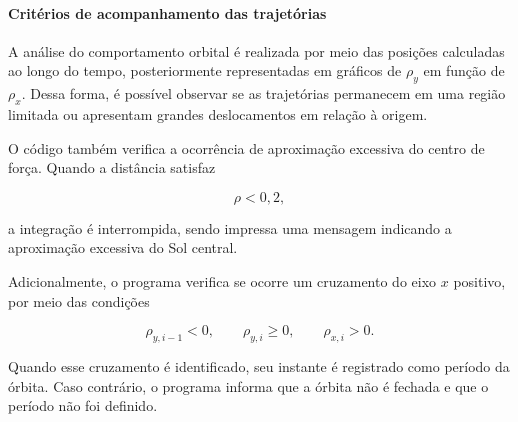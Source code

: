 \documentclass[12pt,a4paper]{article}
\begin{document}
\paragraph{Critérios de acompanhamento das trajetórias}

A análise do comportamento orbital é realizada por meio das posições calculadas ao longo do tempo, posteriormente representadas em gráficos de $\rho_y$ em função de $\rho_x$. Dessa forma, é possível observar se as trajetórias permanecem em uma região limitada ou apresentam grandes deslocamentos em relação à origem.

O código também verifica a ocorrência de aproximação excessiva do centro de força. Quando a distância satisfaz

\begin{equation}
    \rho<0,2,
\end{equation}

a integração é interrompida, sendo impressa uma mensagem indicando a aproximação excessiva do Sol central.

Adicionalmente, o programa verifica se ocorre um cruzamento do eixo $x$ positivo, por meio das condições

\begin{equation}
    \rho_{y,i-1}<0,
    \qquad
    \rho_{y,i}\geq0,
    \qquad
    \rho_{x,i}>0.
\end{equation}

Quando esse cruzamento é identificado, seu instante é registrado como período da órbita. Caso contrário, o programa informa que a órbita não é fechada e que o período não foi definido.
\end{document}
